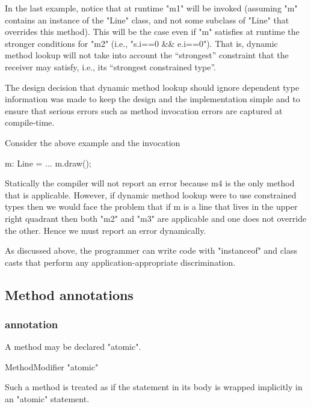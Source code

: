 In the last example, notice that at runtime \xcd"m1" will be invoked
(assuming \xcd"m" contains an instance of the \xcd"Line" class, and not some
subclass of \xcd"Line" that overrides this method). This will be the case
even if \xcd"m" satisfies at runtime the stronger conditions for \xcd"m2" (i.e.,
\xcd"s.i==0 && e.i==0"). That is, dynamic method lookup will not take into
account the  ``strongest'' constraint that the receiver may
satisfy, i.e.,
its ``strongest constrained type''. 

\begin{rationale}
  The design decision that dynamic method lookup should ignore
  dependent type information was made to keep the design and the
  implementation simple and to ensure that serious errors such as
  method invocation errors are captured at compile-time.
 
  Consider the above example and the invocation
\begin{xten}
m: Line = ...
m.draw();    
\end{xten}


   Statically the compiler will not report an error because m4 is the
   only method that is applicable. However, if dynamic method lookup
   were to use constrained types then we would face the problem that if m is a
   line that lives in the upper right quadrant then both \xcd"m2"
   and \xcd"m3"
   are applicable and one does not override the other. Hence we must
   report an error dynamically.

   As discussed above, the programmer can write code with \xcd"instanceof"
   and class casts that perform any application-appropriate
   discrimination.  
\end{rationale}

\subsection{Method annotations}

\subsubsection{ annotation}

A method may be declared \xcd"atomic".

\begin{grammar}
  MethodModifier \: \xcd"atomic"  
\end{grammar}

Such a method is treated as if the statement in its body is wrapped 
implicitly in an \xcd"atomic" statement.

